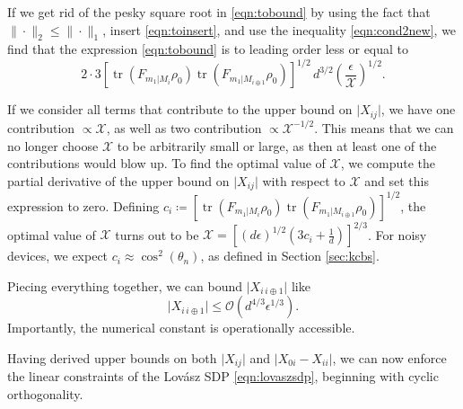If we get rid of the pesky square root in \ref{eqn:tobound} by using the fact that $\|\cdot\|_2\leq \|\cdot\|_1$, insert \ref{eqn:toinsert}, and use the inequality \ref{eqn:cond2new}, we find that the expression \ref{eqn:tobound} is to leading order less or equal to
\begin{equation}
2\cdot3\left[\operatorname{tr}(F_{m_1\vert M_i}\rho_0)\operatorname{tr}(F_{m_1\vert M_{i\oplus 1}}\rho_0)\right]^{1/2}\,d^{3/2}\left(\frac{\epsilon}{\mathcal{X}}\right)^{1/2}.
\end{equation}

If we consider all terms that contribute to the upper bound on $\vert X_{ij} \vert$, we have one contribution $\propto \mathcal{X}$, as well as two contribution $\propto \mathcal{X}^{-1/2}$. This means that we can no longer choose $\mathcal{X}$ to be arbitrarily small or large, as then at least one of the contributions would blow up. To find the optimal value of $\mathcal{X}$, we compute the partial derivative of the upper bound on $\vert X_{ij}\vert$ with respect to $\mathcal{X}$ and set this expression to zero. Defining $ c_i \coloneqq \left[\operatorname{tr}(F_{m_1\vert M_i}\rho_0)\operatorname{tr}(F_{m_1\vert M_{i\oplus 1}}\rho_0)\right]^{1/2}$, the optimal value of $\mathcal{X}$ turns out to be $\mathcal{X}=\left[(d\epsilon)^{1/2}(3c_i +\frac{1}{d})\right]^{2/3}$. For noisy devices, we expect $c_i\approx \cos^2(\theta_n)$, as defined in Section \ref{sec:kcbs}. 

Piecing everything together, we can bound $\vert X_{i\,i\oplus 1} \vert$ like
\begin{equation}
\vert X_{i\,i\oplus 1} \vert \leq \mathcal{O}\left(d^{4/3}\epsilon^{1/3}\right).
\end{equation}
Importantly, the numerical constant is operationally accessible.

Having derived upper bounds on both $\vert X_{ij} \vert$ and $\vert X_{0i}-X_{ii}\vert$, we can now enforce the linear constraints of the Lovász SDP \ref{eqn:lovaszsdp}, beginning with cyclic orthogonality.


